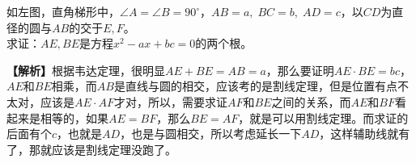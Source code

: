 \documentclass[../main.tex]{subfiles}
\begin{document}
\hrulefill

\begin{exercise}
  \begin{minipage}{0.3\textwidth}
    \centering
  \end{minipage}
  \begin{minipage}{0.7\textwidth}
    如左图，直角梯形中，$\angle A=\angle B=90^{\circ}$，$AB=a, \; BC=b, \; AD=c$，以$CD$为直径的圆与$AB$的交于$E,F$。\\
    求证：$AE,BE$是方程$x^2-ax+bc=0$的两个根。
  \end{minipage}
\end{exercise}
\begin{solution}
  \textbf{【解析】}根据韦达定理，很明显$AE+BE=AB=a$，那么要证明$AE\cdot BE=bc$，$AE$和$BE$相乘，而$AB$是直线与圆的相交，应该考的是割线定理，但是位置有点不太对，应该是$AE\cdot AF$才对，所以，需要求证$AF$和$BE$之间的关系，而$AE$和$BF$看起来是相等的，如果$AE=BF$，那么$BE=AF$，就是可以用割线定理。而求证的后面有个$c$，也就是$AD$，也是与圆相交，所以考虑延长一下$AD$，这样辅助线就有了，那就应该是割线定理没跑了。
\end{solution}

\hrulefill
\end{document}
